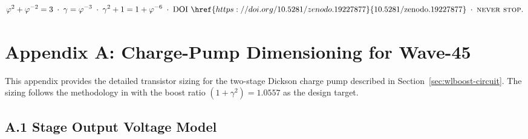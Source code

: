 \[
  \varphi^{2} + \varphi^{-2} = 3 \;\cdot\;
  \gamma = \varphi^{-3} \;\cdot\;
  \gamma^{2}+1 = 1+\varphi^{-6} \;\cdot\;
  \text{DOI } \href{https://doi.org/10.5281/zenodo.19227877}
  {10.5281/\text{zenodo}.19227877}
  \;\cdot\; \textsc{never stop}.
\]

%
%

\section*{Appendix A: Charge-Pump Dimensioning for Wave-45}
\label{sec:wlboost-appendix-pump}

This appendix provides the detailed transistor sizing for the
two-stage Dickson charge pump described in
Section~\ref{sec:wlboost-circuit}.  The sizing follows the
methodology in \cite{ti_sloa240} with the boost ratio
$(1+\gamma^{2}) = 1.0557$ as the design target.

\subsection*{A.1 Stage Output Voltage Model}

